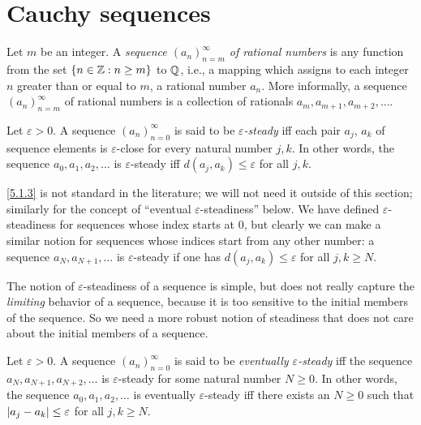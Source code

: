 \section{Cauchy sequences}\label{sec:5.1}

\begin{defn}[Sequences]\label{5.1.1}
  Let \(m\) be an integer.
  A \emph{sequence \((a_n)_{n = m}^{\infty}\) of rational numbers} is any function from the set \(\left\lbrace n \in \mathbb{Z} : n \geq m\right\rbrace\) to \(\mathbb{Q}\), i.e., a mapping which assigns to each integer \(n\) greater than or equal to \(m\), a rational number \(a_n\).
  More informally, a sequence \((a_n)_{n = m}^{\infty}\) of rational numbers is a collection of rationals \(a_m, a_{m + 1}, a_{m + 2}, \dots\).
\end{defn}

\setcounter{thm}{2}
\begin{defn}\label{5.1.3}
  Let \(\varepsilon > 0\).
  A sequence \((a_n)_{n = 0}^{\infty}\) is said to be \emph{\(\varepsilon\)-steady} iff each pair \(a_j\), \(a_k\) of sequence elements is \(\varepsilon\)-close for every natural number \(j, k\).
  In other words, the sequence \(a_0, a_1, a_2, \dots\) is \(\varepsilon\)-steady iff \(d(a_j, a_k) \leq \varepsilon\) for all \(j, k\).
\end{defn}

\begin{rmk}\label{5.1.4}
  \cref{5.1.3} is not standard in the literature;
  we will not need it outside of this section;
  similarly for the concept of ``eventual \(\varepsilon\)-steadiness'' below.
  We have defined \(\varepsilon\)-steadiness for sequences whose index starts at \(0\), but clearly we can make a similar notion for sequences whose indices start from any other number:
  a sequence \(a_N, a_{N + 1}, \dots\) is \(\varepsilon\)-steady if one has \(d(a_j, a_k) \leq \varepsilon\) for all \(j, k \geq N\).
\end{rmk}

\begin{note}
  The notion of \(\varepsilon\)-steadiness of a sequence is simple, but does not really capture the \emph{limiting} behavior of a sequence, because it is too sensitive to the initial members of the sequence.
  So we need a more robust notion of steadiness that does not care about the initial members of a sequence.
\end{note}

\setcounter{thm}{5}
\begin{defn}\label{5.1.6}
  Let \(\varepsilon > 0\).
  A sequence \((a_n)_{n = 0}^{\infty}\) is said to be \emph{eventually \(\varepsilon\)-steady} iff the sequence \(a_N, a_{N + 1}, a_{N + 2}, \dots\) is \(\varepsilon\)-steady for some natural number \(N \geq 0\).
  In other words, the sequence \(a_0, a_1, a_2, \dots\) is eventually \(\varepsilon\)-steady iff there exists an \(N \geq 0\) such that \(\left\lvert a_j - a_k\right\rvert \leq \varepsilon\) for all \(j, k \geq N\).
\end{defn}

